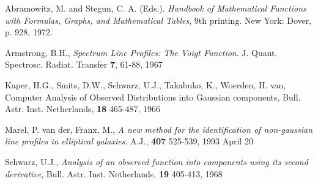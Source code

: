 \documentclass[10pt,a4paper]{report}
\begin{document}
\begin{flushleft}
\item Abramowitz, M. and Stegun, C. A. (Eds.). {\it Handbook of Mathematical 
Functions with Formulas, Graphs, and Mathematical Tables}, 9th printing. New York: Dover, p. 928, 1972. 
\item Armstrong, B.H., {\it Spectrum Line Profiles: The Voigt Function}. J. Quant. Spectrosc. Radiat. Transfer {\bf 7}, 61-88, 1967\\
\item Kaper, H.G., Smits, D.W., Schwarz, U.J., Takabuko, K., Woerden, H. van,
{Computer Analysis of Observed Distributions into Gaussian components},
Bull. Astr. Inst. Netherlands, {\bf 18} 465-487, 1966 
\item Marel, P. van der, Franx, M.,\,\,{\it A new method for the identification of non-gaussian
line profiles in elliptical galaxies}. A.J., {\bf 407} 525-539, 1993 April 20\\
\item Schwarz, U.J., {\it Analysis of an observed function into components
using its second derivative}, Bull. Astr. Inst. Netherlands, {\bf 19} 405-413, 1968
\end{flushleft}
\end{document}
